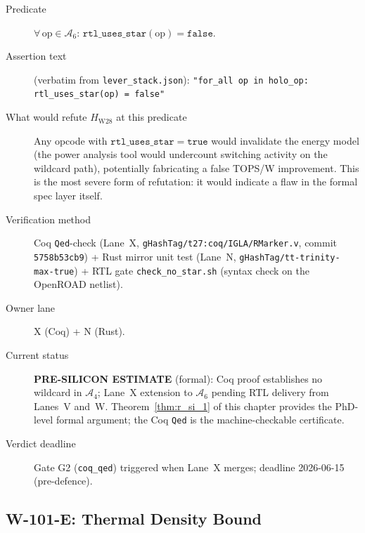\begin{description}
  \item[Predicate] \(\forall\, \mathrm{op} \in \mathcal{A}_{6}:\,
    \mathtt{rtl\_uses\_star}(\mathrm{op}) = \mathtt{false}\).
  \item[Assertion text] (verbatim from \texttt{lever\_stack.json}):
    \texttt{"for\_all op in holo\_op: rtl\_uses\_star(op) = false"}
  \item[What would refute \(H_{\mathrm{W28}}\) at this predicate]
    Any opcode with \(\mathtt{rtl\_uses\_star} = \mathtt{true}\) would
    invalidate the energy model (the power analysis tool would undercount
    switching activity on the wildcard path), potentially fabricating a
    false TOPS/W improvement.  This is the most severe form of refutation:
    it would indicate a flaw in the formal spec layer itself.
  \item[Verification method] Coq \texttt{Qed}-check (Lane~X,
    \texttt{gHashTag/t27:coq/IGLA/RMarker.v}, commit \texttt{5758b53cb9}) +
    Rust mirror unit test (Lane~N, \texttt{gHashTag/tt-trinity-max-true}) +
    RTL gate \texttt{check\_no\_star.sh} (syntax check on the OpenROAD netlist).
  \item[Owner lane] X (Coq) + N (Rust).
  \item[Current status] \textbf{PRE-SILICON ESTIMATE} (formal): Coq proof
    establishes no wildcard in \(\mathcal{A}_{4}\); Lane~X extension to
    \(\mathcal{A}_{6}\) pending RTL delivery from Lanes~V and~W.
    Theorem~\ref{thm:r_si_1} of this chapter provides the PhD-level formal
    argument; the Coq \texttt{Qed} is the machine-checkable certificate.
  \item[Verdict deadline] Gate G2 (\texttt{coq\_qed}) triggered when
    Lane~X merges; deadline 2026-06-15 (pre-defence).
\end{description}

\subsection{W-101-E: Thermal Density Bound}
\label{sec:w101e}

